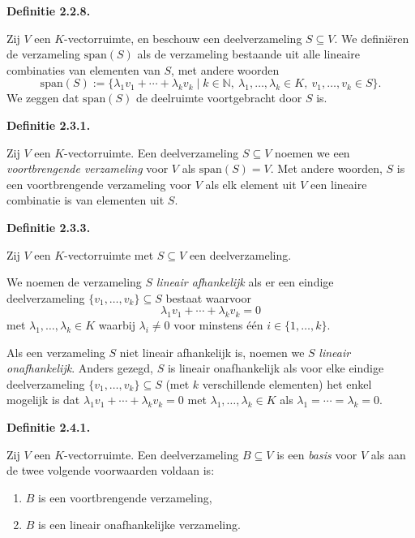 \documentclass[10pt,a4paper]{article}
\newenvironment{res}[1]{%
  \par\noindent\textbf{Definitie #1.}~\ignorespaces
}{%
  \par\vspace{2pt}\normalfont
}
\begin{document}
\begin{res}{2.2.8}
Zij $V$ een $K$-vectorruimte, en beschouw een deelverzameling $S\subseteq V$. We defini\"eren de verzameling $\mathrm{span}(S)$ als de verzameling bestaande uit alle lineaire combinaties van elementen van $S$, met andere woorden
\[
\mathrm{span}(S):=\{\lambda_1v_1+\cdots+\lambda_kv_k \mid k\in\mathbb N,\ \lambda_1,\dots,\lambda_k\in K,\ v_1,\dots,v_k\in S\}.
\]
We zeggen dat $\mathrm{span}(S)$ de deelruimte voortgebracht door $S$ is.
\end{res}

\begin{res}{2.3.1}
Zij $V$ een $K$-vectorruimte. Een deelverzameling $S\subseteq V$ noemen we een \textit{voortbrengende verzameling} voor $V$ als $\mathrm{span}(S)=V$. Met andere woorden, $S$ is een voortbrengende verzameling voor $V$ als elk element uit $V$ een lineaire combinatie is van elementen uit $S$.
\end{res}

\begin{res}{2.3.3}
Zij $V$ een $K$-vectorruimte met $S\subseteq V$ een deelverzameling.
\begin{myenum}
\item We noemen de verzameling $S$ \textit{lineair afhankelijk} als er een eindige deelverzameling $\{v_1,\dots,v_k\}\subseteq S$ bestaat waarvoor
\[
\lambda_1v_1+\cdots+\lambda_kv_k=0
\]
met $\lambda_1,\dots,\lambda_k\in K$ waarbij $\lambda_i\ne0$ voor minstens \'e\'en $i\in\{1,\dots,k\}$.
\item Als een verzameling $S$ niet lineair afhankelijk is, noemen we $S$ \textit{lineair onafhankelijk}. Anders gezegd, $S$ is lineair onafhankelijk als voor elke eindige deelverzameling $\{v_1,\dots,v_k\}\subseteq S$ (met $k$ verschillende elementen) het enkel mogelijk is dat $\lambda_1v_1+\cdots+\lambda_kv_k=0$ met $\lambda_1,\dots,\lambda_k\in K$ als $\lambda_1=\cdots=\lambda_k=0$.
\end{myenum}
\end{res}

\begin{res}{2.4.1}
Zij $V$ een $K$-vectorruimte. Een deelverzameling $B\subseteq V$ is een \textit{basis} voor $V$ als aan de twee volgende voorwaarden voldaan is:
\begin{enumerate}[label=(\arabic*),leftmargin=1.8em,itemsep=1pt,topsep=1pt]
\item $B$ is een voortbrengende verzameling,
\item $B$ is een lineair onafhankelijke verzameling.
\end{enumerate}
\end{res}
\end{document}
